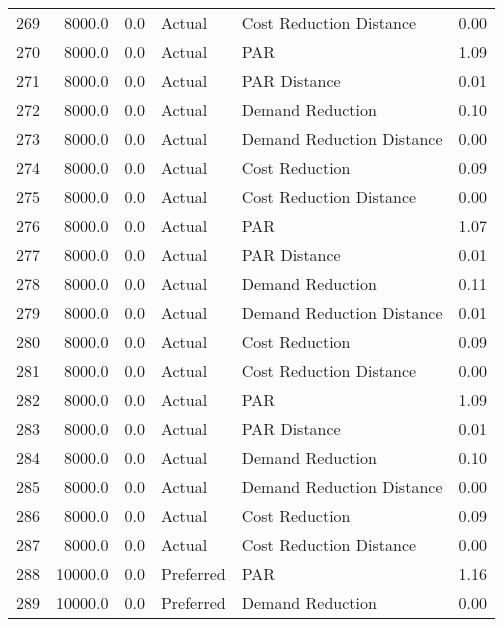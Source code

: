\begin{longtable}{lrrllr}
269  &       8000.0 &     0.0 &         Actual &    Cost Reduction Distance &   0.00 \\
270  &       8000.0 &     0.0 &         Actual &                        PAR &   1.09 \\
271  &       8000.0 &     0.0 &         Actual &               PAR Distance &   0.01 \\
272  &       8000.0 &     0.0 &         Actual &           Demand Reduction &   0.10 \\
273  &       8000.0 &     0.0 &         Actual &  Demand Reduction Distance &   0.00 \\
274  &       8000.0 &     0.0 &         Actual &             Cost Reduction &   0.09 \\
275  &       8000.0 &     0.0 &         Actual &    Cost Reduction Distance &   0.00 \\
276  &       8000.0 &     0.0 &         Actual &                        PAR &   1.07 \\
277  &       8000.0 &     0.0 &         Actual &               PAR Distance &   0.01 \\
278  &       8000.0 &     0.0 &         Actual &           Demand Reduction &   0.11 \\
279  &       8000.0 &     0.0 &         Actual &  Demand Reduction Distance &   0.01 \\
280  &       8000.0 &     0.0 &         Actual &             Cost Reduction &   0.09 \\
281  &       8000.0 &     0.0 &         Actual &    Cost Reduction Distance &   0.00 \\
282  &       8000.0 &     0.0 &         Actual &                        PAR &   1.09 \\
283  &       8000.0 &     0.0 &         Actual &               PAR Distance &   0.01 \\
284  &       8000.0 &     0.0 &         Actual &           Demand Reduction &   0.10 \\
285  &       8000.0 &     0.0 &         Actual &  Demand Reduction Distance &   0.00 \\
286  &       8000.0 &     0.0 &         Actual &             Cost Reduction &   0.09 \\
287  &       8000.0 &     0.0 &         Actual &    Cost Reduction Distance &   0.00 \\
288  &      10000.0 &     0.0 &      Preferred &                        PAR &   1.16 \\
289  &      10000.0 &     0.0 &      Preferred &           Demand Reduction &   0.00 \\

\end{longtable}
